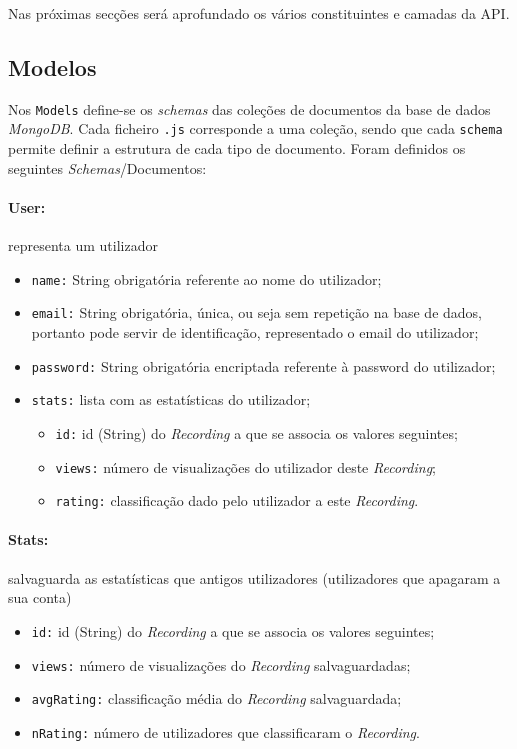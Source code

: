 \documentclass{article}
\begin{document}
Nas próximas secções será aprofundado os vários constituintes e camadas da API.

\subsection{Modelos}

Nos \texttt{Models} define-se os \textit{schemas} das coleções de documentos da base de dados \textit{MongoDB}. Cada ficheiro \texttt{.js} corresponde a uma coleção, sendo que cada \texttt{schema} permite definir a estrutura de cada tipo de documento. Foram definidos os seguintes \textit{Schemas}/Documentos:

\paragraph{\textbf{User:}} representa um utilizador
    \begin{itemize}
        \item \texttt{name:} String obrigatória referente ao nome do utilizador;
        \item \texttt{email:} String obrigatória, única, ou seja sem repetição na base de dados, portanto pode servir de identificação, representado o email do utilizador;
        \item \texttt{password:} String obrigatória encriptada referente à password do utilizador;
        \item \texttt{stats:} lista com as estatísticas do utilizador;
            \begin{itemize}
                \item \texttt{id:} id (String) do \textit{Recording} a que se associa os valores seguintes;
                \item \texttt{views:} número de visualizações do utilizador deste \textit{Recording};
                \item \texttt{rating:} classificação dado pelo utilizador a este \textit{Recording}.
            \end{itemize}
    \end{itemize}

\paragraph{\textbf{Stats:}} salvaguarda as estatísticas que antigos utilizadores (utilizadores que apagaram a sua conta)
    \begin{itemize}
        \item \texttt{id:} id (String) do \textit{Recording} a que se associa os valores seguintes;
        \item \texttt{views:} número de visualizações do \textit{Recording} salvaguardadas;
        \item \texttt{avgRating:} classificação média do \textit{Recording} salvaguardada;
        \item \texttt{nRating:} número de utilizadores que classificaram o \textit{Recording}.
    \end{itemize}
\end{document}
